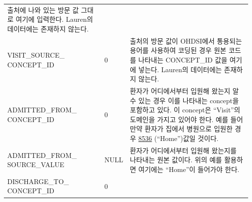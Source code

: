 \documentclass[10.5pt]{book}
\theoremstyle{definition}
\theoremstyle{definition}
\theoremstyle{definition}
\theoremstyle{remark}
\begin{document}
\begin{longtable}[]{@{}lll@{}}
\begin{minipage}[t]{0.48\columnwidth}
출처에 나와 있는 방문 값 그대로 여기에 입력한다. Lauren의 데이터에는
존재하지 않는다.\strut
\end{minipage}\tabularnewline
\begin{minipage}[t]{0.28\columnwidth}\raggedright\strut
VISIT\_SOURCE\_ CONCEPT\_ID\strut
\end{minipage} & \begin{minipage}[t]{0.16\columnwidth}\raggedright\strut
0\strut
\end{minipage} & \begin{minipage}[t]{0.48\columnwidth}\raggedright\strut
출처의 방문 값이 OHDSI에서 통용되는 용어를 사용하여 코딩된 경우 원본
코드를 나타내는 CONCEPT\_ID 값을 여기에 넣는다. Lauren의 데이터에는
존재하지 않는다.\strut
\end{minipage}\tabularnewline
\begin{minipage}[t]{0.28\columnwidth}\raggedright\strut
ADMITTED\_FROM\_ CONCEPT\_ID\strut
\end{minipage} & \begin{minipage}[t]{0.16\columnwidth}\raggedright\strut
0\strut
\end{minipage} & \begin{minipage}[t]{0.48\columnwidth}\raggedright\strut
환자가 어디에서부터 입원해 왔는지 알 수 있는 경우 이를 나타내는
concept을 포함하고 있다. 이 concept은 ``Visit''의 도메인을 가지고 있어야
한다. 예를 들어 만약 환자가 집에서 병원으로 입원한 경우
\href{http://athena.ohdsi.org/search-terms/terms/8536}{8536}
(``Home'')값일 것이다.\strut
\end{minipage}\tabularnewline
\begin{minipage}[t]{0.28\columnwidth}\raggedright\strut
ADMITTED\_FROM\_ SOURCE\_VALUE\strut
\end{minipage} & \begin{minipage}[t]{0.16\columnwidth}\raggedright\strut
NULL\strut
\end{minipage} & \begin{minipage}[t]{0.48\columnwidth}\raggedright\strut
환자가 어디에서부터 입원해 왔는지를 나타내는 원본 값이다. 위의 예를
활용하면 여기에는 ``Home''이 들어가야 한다.\strut
\end{minipage}\tabularnewline
\begin{minipage}[t]{0.28\columnwidth}\raggedright\strut
DISCHARGE\_TO\_ CONCEPT\_ID\strut
\end{minipage} & \begin{minipage}[t]{0.16\columnwidth}\raggedright\strut
0\strut
\end{minipage} & \begin{minipage}[t]{0.48\columnwidth}\raggedright\strut

\end{minipage}
\end{longtable}
\end{document}
